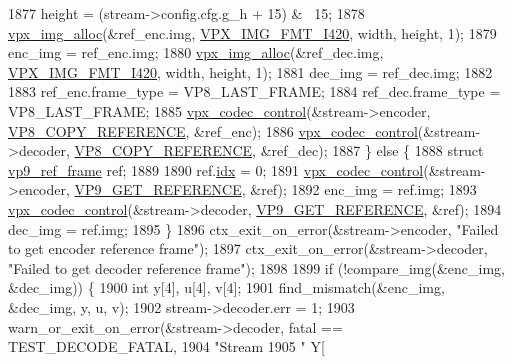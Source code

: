 \begin{DoxyCodeInclude}
{{{{{{{{{{{{{{{{{{{{{{{{{{{{{{{{{{{{{{{{{{{{{{{{{{{{{{1877     height = (stream->config.cfg.g\_h + 15) & ~15;
1878     \hyperlink{vpx__image_8h_ab80398f28ca880368a922fa979eb66c1}{vpx\_img\_alloc}(&ref\_enc.img, \hyperlink{vpx__image_8h_a7a30a7bff7400fb83ad45fede5077193af17ce49c9a6efd7c8c8ea8928d4ce26c}{VPX\_IMG\_FMT\_I420}, width, height, 1);
1879     enc\_img = ref\_enc.img;
1880     \hyperlink{vpx__image_8h_ab80398f28ca880368a922fa979eb66c1}{vpx\_img\_alloc}(&ref\_dec.img, \hyperlink{vpx__image_8h_a7a30a7bff7400fb83ad45fede5077193af17ce49c9a6efd7c8c8ea8928d4ce26c}{VPX\_IMG\_FMT\_I420}, width, height, 1);
1881     dec\_img = ref\_dec.img;
1882 
1883     ref\_enc.frame\_type = VP8\_LAST\_FRAME;
1884     ref\_dec.frame\_type = VP8\_LAST\_FRAME;
1885     \hyperlink{group__codec_gac1b91e04698c1bd4c0a2b8aa85b08cd2}{vpx\_codec\_control}(&stream->encoder, \hyperlink{group__vp8_gga8cadbc8e0af3da96ef7a2dbd4ed06599a5375b3ea3a4867d50daee6f5971c7470}{VP8\_COPY\_REFERENCE}, &ref\_enc);
1886     \hyperlink{group__codec_gac1b91e04698c1bd4c0a2b8aa85b08cd2}{vpx\_codec\_control}(&stream->decoder, \hyperlink{group__vp8_gga8cadbc8e0af3da96ef7a2dbd4ed06599a5375b3ea3a4867d50daee6f5971c7470}{VP8\_COPY\_REFERENCE}, &ref\_dec);
1887   \} \textcolor{keywordflow}{else} \{
1888     \textcolor{keyword}{struct }\hyperlink{structvp9__ref__frame}{vp9\_ref\_frame} ref;
1889 
1890     ref.\hyperlink{structvp9__ref__frame_a26e0d119a61c29b72c6ccb91748b6b82}{idx} = 0;
1891     \hyperlink{group__codec_gac1b91e04698c1bd4c0a2b8aa85b08cd2}{vpx\_codec\_control}(&stream->encoder, \hyperlink{group__vp8_gga8cadbc8e0af3da96ef7a2dbd4ed06599a91e44472b21c720a9a7d087c7226d083}{VP9\_GET\_REFERENCE}, &ref);
1892     enc\_img = ref.img;
1893     \hyperlink{group__codec_gac1b91e04698c1bd4c0a2b8aa85b08cd2}{vpx\_codec\_control}(&stream->decoder, \hyperlink{group__vp8_gga8cadbc8e0af3da96ef7a2dbd4ed06599a91e44472b21c720a9a7d087c7226d083}{VP9\_GET\_REFERENCE}, &ref);
1894     dec\_img = ref.img;
1895   \}
1896   ctx\_exit\_on\_error(&stream->encoder, \textcolor{stringliteral}{"Failed to get encoder reference frame"});
1897   ctx\_exit\_on\_error(&stream->decoder, \textcolor{stringliteral}{"Failed to get decoder reference frame"});
1898 
1899   \textcolor{keywordflow}{if} (!compare\_img(&enc\_img, &dec\_img)) \{
1900     \textcolor{keywordtype}{int} y[4], u[4], v[4];
1901     find\_mismatch(&enc\_img, &dec\_img, y, u, v);
1902     stream->decoder.err = 1;
1903     warn\_or\_exit\_on\_error(&stream->decoder, fatal == TEST\_DECODE\_FATAL,
1904                           \textcolor{stringliteral}{"Stream %
1905                           \textcolor{stringliteral}{" Y[%
}}}}}}}}}}}}}}}}}}}}}}}}}}}}}}}}}}}}}}}}}}}}}}}}}}}}}}}}
\end{DoxyCodeInclude}

